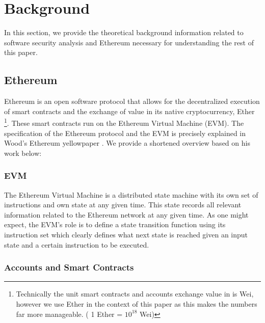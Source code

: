\documentclass[letterpaper,twocolumn,10pt]{article}
\begin{document}
\section{Background}
In this section, we provide the theoretical background information related to software security analysis and Ethereum necessary for understanding the rest of this paper.

\subsection{Ethereum}
Ethereum is an open software protocol that allows for the decentralized execution of smart contracts and the exchange of value in its native cryptocurrency, Ether \footnote{Technically the unit smart contracts and accounts exchange value in is Wei, however we use Ether in the context of this paper as this makes the numbers far more manageable. ( 1 Ether = $10^{18}$ Wei) }.  These smart contracts run on the Ethereum Virtual Machine (EVM). The specification of the Ethereum protocol and the EVM is precisely explained in Wood's Ethereum yellowpaper \cite{wood_2021}. We provide a shortened overview based on his work below:

\subsubsection{EVM}

The Ethereum Virtual Machine is a distributed state machine with its own set of instructions and own state at any given time. This state records all relevant information related to the Ethereum network at any given time. As one might expect, the EVM's role is to define a state transition function using its instruction set which clearly defines what next state is reached given an input state and a certain instruction to be executed. 

\subsubsection{Accounts and Smart Contracts}
\end{document}
